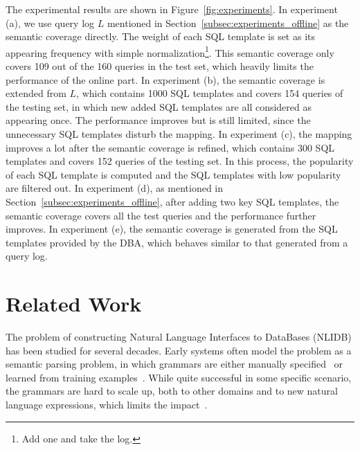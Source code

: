 \documentclass{vldb}
\begin{document}
The experimental results are shown in Figure~\ref{fig:experiments}.  In experiment (a), we use query log $L$ mentioned in Section~\ref{subsec:experiments_offline} as the semantic coverage directly.  The weight of each SQL template is set as its appearing frequency with simple normalization\footnote{Add one and take the log. }.  This semantic coverage only covers 109 out of the 160 queries in the test set, which heavily limits the performance of the online part.  In experiment (b), the semantic coverage is extended from $L$, which contains 1000 SQL templates and covers 154 queries of the testing set, in which new added SQL templates are all considered as appearing once.  The performance improves but is still limited, since the unnecessary SQL templates disturb the mapping.  In experiment (c), the mapping improves a lot after the semantic coverage is refined, which contains 300 SQL templates and covers 152 queries of the testing set.   In this process, the popularity of each SQL template is computed and the SQL templates with low popularity are filtered out.  In experiment (d), as mentioned in Section~\ref{subsec:experiments_offline}, after adding two key SQL templates, the semantic coverage covers all the test queries and the performance further improves. In experiment (e), the semantic coverage is generated from the SQL templates provided by the DBA, which behaves similar to that generated from a query log.  

\section{Related Work}
\label{sec:relatedWork}
The problem of constructing Natural Language Interfaces to DataBases (NLIDB) has been studied for several decades.  Early systems often model the problem as a semantic parsing problem, in which grammars are either manually specified~\cite{DBLP:journals/nle/AndroutsopoulosRT95} or learned from training examples~\cite{Zelle:1996:LPD:1864519.1864543,DBLP:conf/ecml/TangM01,DBLP:bibsonomy_ge2005,DBLP:conf/acl/WongM07}.  While quite successful in some specific scenario, the grammars are hard to scale up, both to other domains and to new natural language expressions, which limits the impact~\cite{Liang:2011:LDC:2002472.2002547}.  
\end{document}
